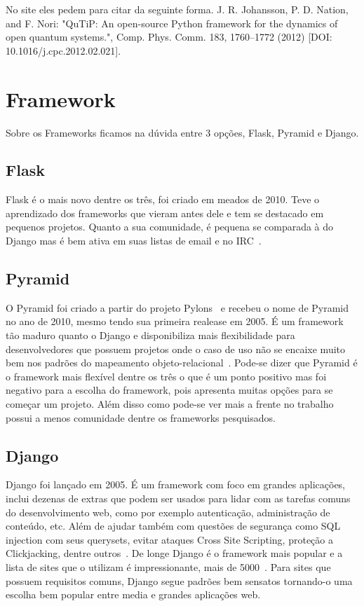 \documentclass[a4paper, 12pt, oneside]{book}
\begin{document}
No site eles pedem para citar da seguinte forma.
J. R. Johansson, P. D. Nation, and F. Nori: "QuTiP: An open-source Python framework for the dynamics of open quantum systems.", Comp. Phys. Comm. 183, 1760–1772 (2012) [DOI: 10.1016/j.cpc.2012.02.021]. 

\section{Framework}

Sobre os Frameworks ficamos na dúvida entre 3 opções, Flask, Pyramid e Django.
\subsection{Flask}
Flask é o mais novo dentre os três, foi criado em meados de 2010. Teve o aprendizado dos frameworks que vieram antes dele e tem se destacado em pequenos projetos. Quanto a sua comunidade, é pequena se comparada à do Django mas é bem ativa em suas listas de email e no IRC~\cite{ryanbrown}. 

\subsection{Pyramid}
O Pyramid foi criado a partir do projeto Pylons~\cite{pylonsproject} e recebeu o nome de Pyramid no ano de 2010, mesmo tendo sua primeira realease em 2005. É um framework tão maduro quanto o Django e disponibiliza mais flexibilidade para desenvolvedores que possuem projetos onde o caso de uso não se encaixe muito bem nos padrões do mapeamento objeto-relacional~\cite{pyramid}. Pode-se dizer que Pyramid é o framework mais flexível dentre os três o que é um ponto positivo mas foi negativo para a escolha do framework, pois apresenta muitas opções para se começar um projeto. Além disso como pode-se ver mais a frente no trabalho possui a menos comunidade dentre os frameworks pesquisados.

\subsection{Django}
Django foi lançado em 2005. É um framework com foco em grandes aplicações, inclui dezenas de extras que podem ser usados para lidar com as tarefas comuns do desenvolvimento web, como por exemplo autenticação, administração de conteúdo, etc. Além de ajudar também com questões de segurança como SQL injection com seus querysets, evitar ataques Cross Site Scripting, proteção a Clickjacking, dentre outros~\cite{django}. De longe Django é o framework mais popular e a lista de sites que o utilizam é impressionante, mais de 5000~\cite{listadjangosites}. Para sites que possuem requisitos comuns, Django segue padrões bem sensatos tornando-o uma escolha bem popular entre media e grandes aplicações web.
\end{document}
